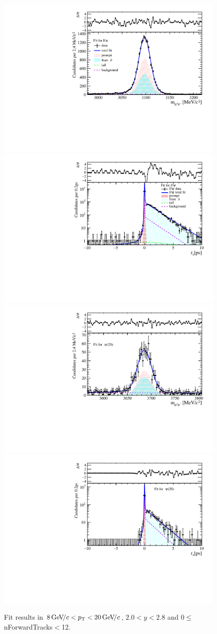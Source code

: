 \begin{figure}[H]
\begin{center}
\includegraphics[width=0.47\linewidth]{pdf/Jpsi/drawmassF/n1y1pt5.pdf}
\includegraphics[width=0.47\linewidth]{pdf/Jpsi/2DFitF/n1y1pt5.pdf}
\vspace*{-0.5cm}
\includegraphics[width=0.47\linewidth]{pdf/Psi2S/drawmassF/n1y1pt5.pdf}
\includegraphics[width=0.47\linewidth]{pdf/Psi2S/2DFitF/n1y1pt5.pdf}
\vspace*{-0.5cm}
\end{center}
\caption{Fit results in $8\text{\,Ge\kern -0.1em V\!/}c<p_{\mathrm{T}}<20\text{\,Ge\kern -0.1em V\!/}c$, $2.0<y<2.8$ and 0$\leq$nForwardTracks$<$12.}
\label{Fitn1y1pt5}
\end{figure}
